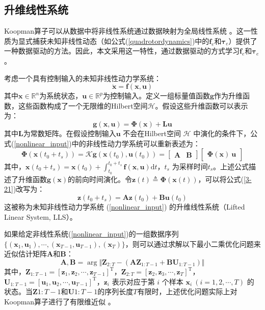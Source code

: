 \documentclass[lang=chs, degree=master, blindreview=false, winfonts=true]{yanputhesis}
\begin{document}
\subsection{升维线性系统}
Koopman算子可以从数据中将非线性系统通过数据映射为全局线性系统 \cite{Mamakoukas2023}。这一性质为显式捕获未知非线性动态（如公式(\ref{quadrotordynamics})中的$\bm f_e$和$\bm \tau_e$）提供了一种数据驱动的方法。因此，本文采用这一特性，通过数据驱动的方式学习$\bm f_e$和$\bm \tau_e$。

考虑一个具有控制输入的未知非线性动力学系统： \begin{equation} \dot{\bm{x}} = \bm{f}(\bm{x},\bm{u}) \label{nonlinear_input} \end{equation} 其中$\bm{x} \in \mathbb{R}^n$为系统状态，$\bm{u} \in \mathbb{R}^p$为控制输入。定义一组标量值函数$\bm{g}$作为升维函数，这些函数构成了一个无限维的Hilbert空间$\mathcal{H}$。假设这些升维函数可以表示为： \begin{equation} \bm{g}(\bm{x},\bm{u}) = \bm{\Phi}(\bm{x}) + \bm{L}\bm{u} \end{equation} 其中$\bm{L}$为常数矩阵。在假设控制输入$\bm{u}$ 不会在Hilbert空间 $\mathcal{H}$ 中演化的条件下，公式(\ref{nonlinear_input})中的非线性动力学系统可以重新表述为： \begin{equation} \bm{\Phi}(\bm{x}(t_0+t_s)) = \bm{\mathcal{K}} \bm{g}(\bm{x}(t_0), \bm{u}(t_0)) = \begin{bmatrix} \bm{A} & \bm{B} \end{bmatrix} \begin{bmatrix} \bm{\Phi}(\bm{x}) \ \bm{u} \end{bmatrix}
\label{3-21} \end{equation} 其中，$\bm{x}(t_0+t_s)=\bm{x}(t_0)+\int_{t_0}^{t_0+t_s}\bm{f}(\bm{x},\bm{u}){\mathrm{d}t}$，$t_s$ 为采样时间$t_s$。上述公式描述了升维函数$\bm{g}(\bm{x})$的前向时间演化。令$\bm{z}(t) \triangleq \bm{\Phi}(\bm{x}(t))$，可以将公式(\ref{3-21})改写为： \begin{equation} \bm{z}(t_0 + t_s) = \bm{A}\bm{z}(t_0) + \bm{B}\bm{u}(t_0) \label{lls} \end{equation} 这被称为未知非线性动力学系统 (\ref{nonlinear_input}) 的升维线性系统（Lifted Linear System, LLS）。

如果给定非线性系统(\ref{nonlinear_input})的一组数据序列 $\{(\bm{x}_1,\bm{u}_1),\cdots,(\bm{x}_{T-1},\bm{u}_{T-1}),(\bm{x}_T)\}$，则可以通过求解以下最小二乘优化问题来近似估计矩阵$\bm{A}$和$\bm{B}$：
\begin{equation}
	\bm{A},\bm{B} = \mathop{\arg\min\limits_{\bm{A},\bm{B}}} \Vert \bm{Z}_{2:T} - (\bm{A}\bm{Z}_{1:T-1}+\bm{B}\bm{U}_{1:T-1}) \Vert \label{LS_AB}
\end{equation} 
其中，$\bm{Z}_{1:T-1}= [ \bm{z}_1,\bm{z}_2,\cdots,\bm{z}_{T-1} ]^\mathrm{T}$，$\bm{Z}_{2:T}= [\bm{z}_2,\bm{z}_3,\cdots,\bm{z}_{T}]^\mathrm{T}$，$\bm{U}_{1:T-1}= [\bm{u}_1,\bm{u}_2,\cdots,\bm{u}_{T-1}]^\mathrm{T}$，$\bm{z}_i$ 表示对应于第 $i$ 个样本 $\bm{x}_i\ (i=1,2,\cdots,T)$ 的状态。当$\bm{Z}{1:T-1}$和$\bm{U}{1:T-1}$的序列长度$T$有限时，上述优化问题实际上对Koopman算子进行了有限维近似 \cite{Hao2024}。
\end{document}

